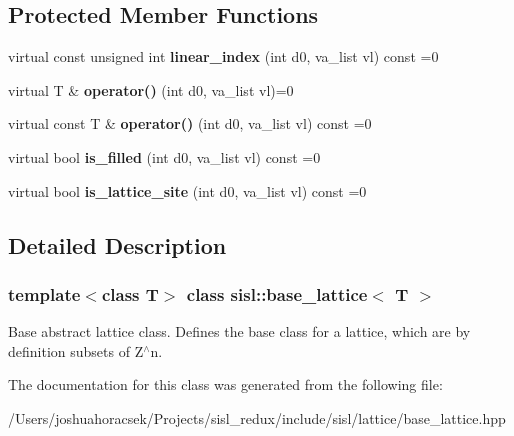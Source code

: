 \subsection*{Protected Member Functions}
\begin{DoxyCompactItemize}
\item 
\mbox{\label{classsisl_1_1base__lattice_ab04b5358fb717e4f14a7ba8d4c65ebf0}} 
virtual const unsigned int {\bfseries linear\+\_\+index} (int d0, va\+\_\+list vl) const =0
\item 
\mbox{\label{classsisl_1_1base__lattice_af588d28f96cd42b92bf0d8f81170899d}} 
virtual T \& {\bfseries operator()} (int d0, va\+\_\+list vl)=0
\item 
\mbox{\label{classsisl_1_1base__lattice_a15fc29455feb062e995773f7dc728114}} 
virtual const T \& {\bfseries operator()} (int d0, va\+\_\+list vl) const =0
\item 
\mbox{\label{classsisl_1_1base__lattice_a7cc857d33e9d15d6ee85d47821d7ab3b}} 
virtual bool {\bfseries is\+\_\+filled} (int d0, va\+\_\+list vl) const =0
\item 
\mbox{\label{classsisl_1_1base__lattice_a64b9bca3305602a1613c8732a4cdb74f}} 
virtual bool {\bfseries is\+\_\+lattice\+\_\+site} (int d0, va\+\_\+list vl) const =0
\end{DoxyCompactItemize}


\subsection{Detailed Description}
\subsubsection*{template$<$class T$>$\newline
class sisl\+::base\+\_\+lattice$<$ T $>$}

Base abstract lattice class. Defines the base class for a lattice, which are by definition subsets of Z$^\wedge$n. 

The documentation for this class was generated from the following file\+:\begin{DoxyCompactItemize}
\item 
/\+Users/joshuahoracsek/\+Projects/sisl\+\_\+redux/include/sisl/lattice/base\+\_\+lattice.\+hpp\end{DoxyCompactItemize}
